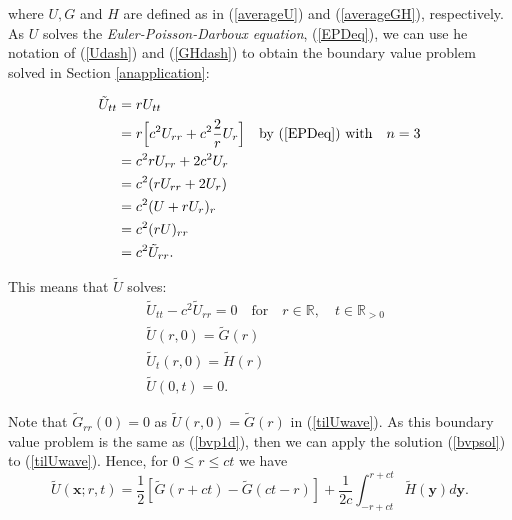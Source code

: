 \documentclass[a4paper, 12pt]{article}
\numberwithin{equation}{section}
\begin{document}
where $U,G$ and $H$ are defined as in (\ref{averageU}) and (\ref{averageGH}),
respectively. \\

As $U$ solves the \emph{Euler-Poisson-Darboux equation}, (\ref{EPDeq}), we can
use he notation of (\ref{Udash}) and (\ref{GHdash}) to obtain the boundary value
problem solved in Section \ref{anapplication}:

\begin{equation*}
    \begin{aligned}
        \tilde{U}_{tt}&=rU_{tt}\\
        &=r\Big[c^2U_{rr}+c^2\frac{2}{r}U_r\Big] \quad \textrm{by (\ref{EPDeq}) with} \quad n=3\\
        &=c^2rU_{rr}+2c^2U_r\\
        &=c^2(rU_{rr}+2U_r)\\
        &=c^2(U+rU_r)_r\\
        &=c^2(rU)_{rr}\\
        &=c^2\tilde{U}_{rr}.        
    \end{aligned}
\end{equation*}

This means that $\tilde{U}$ solves:
\begin{equation} \label{tilUwave}
    \begin{aligned}
        &\tilde{U}_{tt}-c^2\tilde{U}_{rr}=0 \quad \textrm {for} \quad r \in \mathbb{R}, \quad t \in \mathbb{R}_{>0}\\
        &\tilde{U}(r, 0)=\tilde{G}(r) \\
        &\tilde{U}_t(r, 0)=\tilde{H}(r)\\
        &\tilde{U}(0, t)=0.
    \end{aligned}
\end{equation}

Note that $\tilde{G}_{rr}(0)=0$ as $\tilde{U}(r,0)=\tilde{G}(r)$ in
(\ref{tilUwave}). As this boundary value problem is the same as (\ref{bvp1d}),
then we can apply the solution (\ref{bvpsol}) to (\ref{tilUwave}). Hence, for $0
\le r \le ct$ we have 
\begin{equation} \label{newUtil}
    \tilde{U}(\boldsymbol{x};r,t)=\frac{1}{2}\left[\tilde{G}(r+ct)-\tilde{G}(ct-r)\right]+\frac{1}{2c}\int^{r+ct}_{-r+ct}\tilde{H}(\boldsymbol{y})d\boldsymbol{y}.
\end{equation} 
\end{document}
